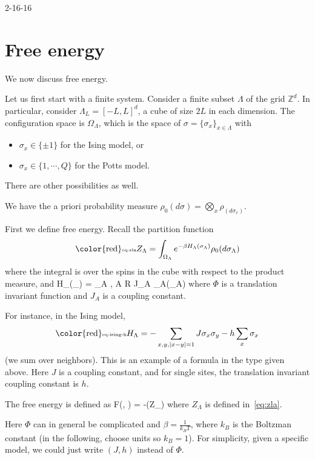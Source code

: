 
{\color{blue}2-16-16}

\section{Free energy}

We now discuss free energy. 

Let us first start with a finite system. Consider a finite subset $\Lambda$ of the grid $\mathbb{Z}^d$. In particular, consider $\Lambda_L = [-L, L]^d$, a cube of size $2L$ in each dimension. The configuration space is $\Omega_{\Lambda}$, which is the space of $\sigma=\{\sigma_x\}_{x \in \Lambda}$ with 
\begin{itemize}
\item
$\sigma_x \in \{\pm 1\}$ for the Ising model, or 
\item $\sigma_x\in \{1, \cdots, Q\}$ for the Potts model. 
\end{itemize}
There are other possibilities as well. 

We have the a priori probability measure $\rho_0(d\sigma) = \bigotimes_x \rho_(d\sigma_x)$. 

First we define free energy. Recall the  partition function
\begin{equation}\label{eq:zla}\text{{\color{red}\tiny eq:zla}}
Z_{\Lambda} = \int_{\Omega_\Lambda} e^{-\beta H_{\Lambda}(\sigma_{\Lambda})}\rho_0(d\sigma_\Lambda)
\end{equation}
where the integral is over the spins in the cube with respect to the product measure, and 
\be
H_{\Lambda}(\sigma_{\Lambda}) = \sum_{A \subset \Lambda,  A \leq R} J_A \Phi_{A}(\sigma_A)
\ee
where $\Phi$ is a translation invariant function and $J_A$ is a coupling constant.  

For instance, in the Ising model, 
\begin{equation}\label{eq:ising-h}\text{{\color{red}\tiny eq:ising-h}}
H_{\Lambda} = -\sum_{x, y, |x - y| = 1} J \sigma_x\sigma_y - h\sum_x \sigma_x
\end{equation} 
(we sum over neighbors). This is an example of a formula in the type given above. Here $J$ is a coupling constant, and for single sites, the translation invariant coupling constant is $h$.  

\begin{definition}
The free energy is defined as 
\be
F(\beta, \Phi) = -\ln(Z_\Lambda)
\ee
where $Z_{\Lambda}$ is defined in~\eqref{eq:zla}.
\end{definition}
Here $\Phi$ can in general be complicated and $\beta = \frac{1}{k_{B}T}$, where $k_{B}$ is the Boltzman constant (in the following, choose units so $k_B=1$). For simplicity, given a specific model, we could just write $(J, h)$ instead of $\Phi$. 


